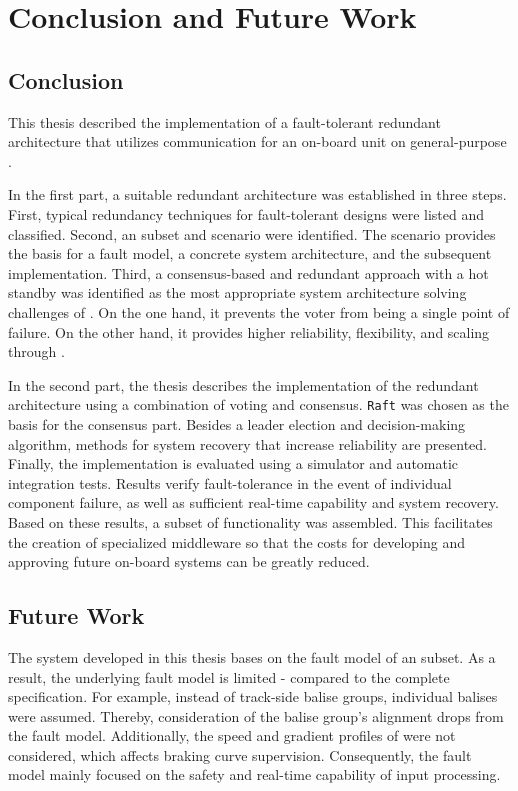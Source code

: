 \chapter{Conclusion and Future Work}

\section{Conclusion}
This thesis described the implementation of a fault-tolerant redundant architecture that utilizes  communication for an  on-board unit on general-purpose .

In the first part, a suitable redundant architecture was established in three steps.
First, typical redundancy techniques for fault-tolerant designs were listed and classified.
Second, an  subset and scenario were identified.
The scenario provides the basis for a fault model, a concrete system architecture, and the subsequent implementation.
Third, a consensus-based and redundant approach with a hot standby was identified as the most appropriate system architecture solving challenges of .
On the one hand, it prevents the voter from being a single point of failure.
On the other hand, it provides higher reliability, flexibility, and scaling through .

In the second part, the thesis describes the implementation of the redundant architecture using a combination of voting and consensus.
\texttt{Raft} was chosen as the basis for the consensus part.
Besides a leader election and decision-making algorithm, methods for system recovery that increase reliability are presented.
Finally, the implementation is evaluated using a simulator and automatic integration tests.
Results verify fault-tolerance in the event of individual component failure, as well as sufficient real-time capability and system recovery.
Based on these results, a subset of  functionality was assembled.
This facilitates the creation of specialized  middleware so that the costs for developing and approving future  on-board systems can be greatly reduced.


\section{Future Work}

The system developed in this thesis bases on the fault model of an  subset.
As a result, the underlying fault model is limited - compared to the complete  specification.
For example, instead of track-side balise groups, individual balises were assumed.
Thereby, consideration of the balise group's alignment drops from the fault model.
Additionally, the speed and gradient profiles of  were not considered, which affects braking curve supervision.
Consequently, the fault model mainly focused on the safety and real-time capability of input processing.


